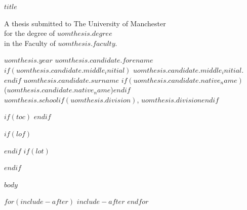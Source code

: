 \documentclass[$if(fontsize)$$fontsize$,$endif$a4paper]{report}
\begin{document}
\begin{titlepage}
\centering
\vspace*{6cm}
{\Large\bfseries $title$\par}
\vspace{3cm}
A thesis submitted to The University of Manchester\\
for the degree of $uomthesis.degree$\\
in the Faculty of $uomthesis.faculty$.
\vspace{3cm}

$uomthesis.year$
\vfill
$uomthesis.candidate.forename$$if(uomthesis.candidate.middle_initial)$ $uomthesis.candidate.middle_initial$.$endif$ $uomthesis.candidate.surname$
$if(uomthesis.candidate.native_name)$\\($uomthesis.candidate.native_name$)$endif$\\[1ex]
$uomthesis.school$$if(uomthesis.division)$, $uomthesis.division$$endif$
\end{titlepage}

$if(toc)$
\setcounter{tocdepth}{$toc-depth$}
\tableofcontents
$endif$

$if(lof)$\listoffigures$endif$
$if(lot)$\listoftables$endif$

$body$

$for(include-after)$
$include-after$
$endfor$
\end{document}
